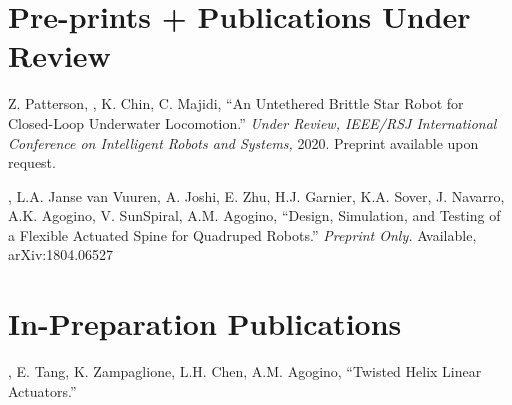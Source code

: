 \documentclass[letterpaper]{deedy-resume} %
\begin{document}
{%

\section{Pre-prints + Publications Under Review}

\vspace{0.2cm}

\begin{etaremune}

\item Z. Patterson, \underline{{}}, K. Chin, C. Majidi, ``An Untethered Brittle Star Robot for Closed-Loop Underwater Locomotion.'' {\it Under Review, IEEE/RSJ International Conference on Intelligent Robots and Systems,} 2020. Preprint available upon request.

\item \underline{{}}, L.A. Janse van Vuuren, A. Joshi, E. Zhu, H.J. Garnier, K.A. Sover, J. Navarro, A.K. Agogino, V. SunSpiral, A.M. Agogino, ``Design, Simulation, and Testing of a Flexible Actuated Spine for Quadruped Robots.'' {\it Preprint Only.} Available, arXiv:1804.06527 

\end{etaremune}  

  
\section{In-Preparation Publications}

\vspace{0.2cm}

\begin{etaremune}



\item \underline{{}}, E. Tang, K. Zampaglione, L.H. Chen, A.M. Agogino, ``Twisted Helix Linear Actuators.''
  

\end{etaremune}}
\end{document}
